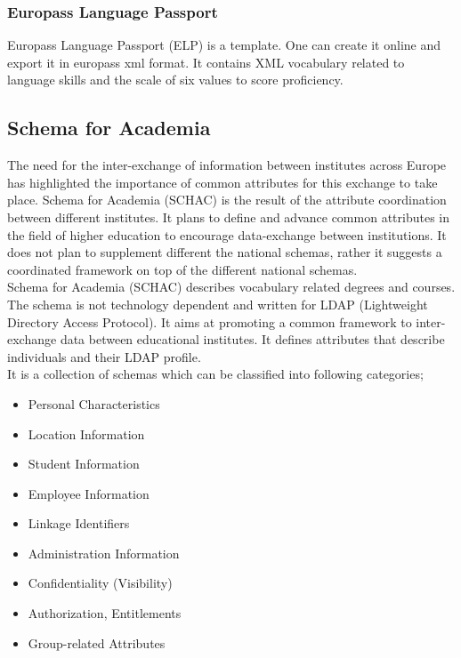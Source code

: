 \documentclass[12pt,a4paper,oneside]{book}
\begin{document}
        \subsubsection{Europass Language Passport}
        Europass Language Passport (ELP) is a template. One can create it online and export it in europass xml format. It contains XML vocabulary related to language skills and the scale of six values to score proficiency. \\

    \subsection{Schema for Academia}
    The need for the inter-exchange of information between institutes across Europe has highlighted the importance of common attributes for this exchange to take place. Schema for Academia (SCHAC) is the result of the attribute coordination between different institutes. It plans to define and advance common attributes in the field of higher education to encourage data-exchange between institutions. It does not plan to supplement different the national schemas, rather it suggests a coordinated framework on top of the different national schemas. \\
    
    Schema for Academia (SCHAC) describes vocabulary related degrees and courses. The schema is not technology dependent and written for LDAP (Lightweight Directory Access Protocol). It aims at promoting a common framework to inter-exchange data between educational institutes. It defines attributes that describe individuals and their LDAP profile. \\
    
	It is a collection of schemas which can be classified into following categories;
\begin{itemize}
\item
Personal Characteristics
\item
Location Information
\item
Student Information
\item
Employee Information
\item
Linkage Identifiers
\item
Administration Information
\item
Confidentiality (Visibility)
\item
Authorization, Entitlements
\item
Group-related Attributes
\end{itemize}
\end{document}
